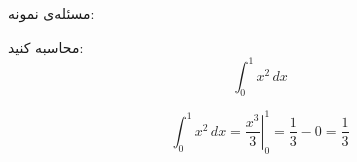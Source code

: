 \begin{prob}
    مسئله‌ی نمونه:

    محاسبه کنید:
    \[
    \int_{0}^{1} x^2 \, dx
    \]
\end{prob}

\begin{sol}

    \[
    \int_{0}^{1} x^2 \, dx = \left. \frac{x^3}{3} \right|_{0}^{1} = \frac{1}{3} - 0 = \frac{1}{3}
    \]
\end{sol}